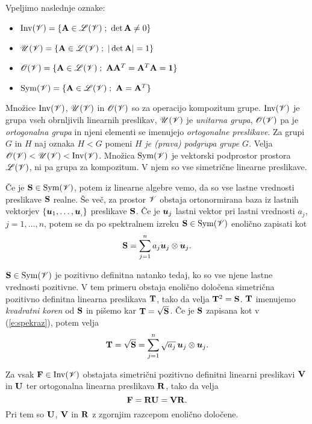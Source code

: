 Vpeljimo naslednje oznake:
\begin{itemize}
	\item $\mathrm{Inv}(\V)=\{\ten{A}\in\L(\V)\;;\ \det\ten{A}\neq 0 \}$
	\item $\mathscr{U}(\V)=\{\ten{A}\in\L(\V)\;;\ |\det\ten{A}|=1 \}$
	\item $\mathscr{O}(\V)=\{\ten{A}\in\L(\V)\;;\ \ten{A}\ten{A}^T=\ten{A}^T\ten{A}=\ten{1} \}$
	\item $\mathrm{Sym}(\V)=\{\ten{A}\in\L(\V)\;;\ \ten{A}=\ten{A}^T \}$
\end{itemize}
Množice $\mathrm{Inv}(\mathscr V)$, $\mathscr{U}(\mathscr V)$ in $\mathscr{O}(\mathscr V)$ so za operacijo kompozitum
grupe. $\mathrm{Inv}(\mathscr V)$ je grupa vseh obrnljivih linearnih preslikav, $\mathscr{U}(\mathscr V)$
je \emph{unitarna grupa}, $\mathscr{O}(\mathscr V)$ pa je \emph{ortogonalna grupa} in njeni elementi
se imenujejo \emph{ortogonalne preslikave}. Za grupi $G$ in $H$ naj oznaka $H<G$ pomeni \textit{$H$
je (prava) podgrupa grupe $G$}. Velja $\mathscr{O}(\mathscr V)<\mathscr{U}(\mathscr V)<\mathrm{Inv}(\mathscr V)$.
Množica $\mathrm{Sym}(\mathscr V)$ je vektorski podprostor prostora $\mathscr L(\mathscr V)$, ni pa grupa za kompozitum.
V njem so vse simetrične linearne preslikave.

Če je $\mathbf S\in\mathrm{Sym}(\mathscr V)$, potem iz linearne algebre vemo, da so vse lastne
vrednosti preslikave $\mathbf S$ realne. Še več, za prostor $\mathscr V$ obstaja ortonormirana baza
iz lastnih vektorjev $\{\boldsymbol u_1,\dots,\boldsymbol u_,\}$ preslikave $\mathbf S$. Če je
$\boldsymbol u_j$ lastni vektor pri lastni vrednosti $a_j$, $j=1,\dots,n$, potem se da po spektralnem
izreku $\mathbf S\in\mathrm{Sym}(\mathscr V)$ enolično zapisati kot
\begin{equation} \label{e:spekraz}
	\mathbf S=\sum_{j=1}^n a_j\boldsymbol u_j\otimes\boldsymbol u_j.
\end{equation}

$\mathbf S\in\mathrm{Sym}(\mathscr V)$ je pozitivno definitna natanko tedaj, ko so vse njene
lastne vrednosti pozitivne. V tem primeru obstaja enolično določena simetrična pozitivno
definitna linearna preslikava $\mathbf T$, tako da velja $\mathbf T^2=\mathbf S$.
$\mathbf T$ imenujemo \emph{kvadratni koren} od $\mathbf S$ in pišemo kar $\mathbf T=\sqrt{\mathbf S}$.
Če je $\mathbf S$ zapisana kot v (\ref{e:spekraz}), potem velja
\[
	\mathbf T=\sqrt{\mathbf S}=\sum_{j=1}^n \sqrt{a_j}\,\boldsymbol u_j\otimes\boldsymbol u_j.
\]

\begin{izrek} \label{i:polraz}
	Za vsak $\mathbf F\in\textrm{Inv}(\mathscr V)$
	obstajata simetrični pozitivno definitni linearni preslikavi $\mathbf V$ in $\mathbf U$
	ter ortogonalna linearna preslikava $\mathbf R$, tako da velja
	\[
		\mathbf F=\mathbf R\mathbf U=\mathbf V\mathbf R.
	\]
	Pri tem so $\mathbf U$, $\mathbf V$ in $\mathbf R$ z zgornjim razcepom enolično določene.
\end{izrek}

